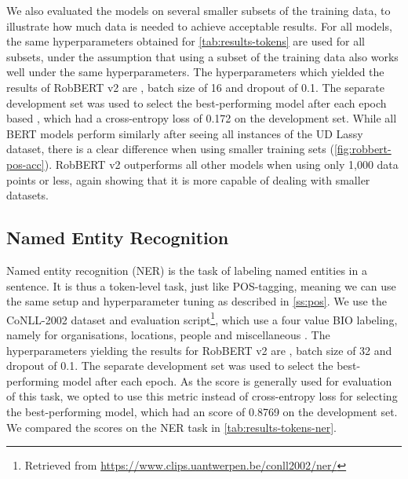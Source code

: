 \documentclass[11pt,a4paper]{article}
\begin{document}
We also evaluated the models on several smaller subsets of the training data, to illustrate how much data is needed to achieve acceptable results.
For all models, the same hyperparameters obtained for \autoref{tab:results-tokens} are used for all subsets, under the assumption that using a subset of the training data also works well under the same hyperparameters.
The hyperparameters which yielded the results of RobBERT v2 are , batch size of 16 and dropout of 0.1.
The separate development set was used to select the best-performing model after each epoch based , which had a cross-entropy loss of 0.172 on the development set.
While all BERT models perform similarly after seeing all instances of the UD Lassy dataset, there is a clear difference when using smaller training sets (\autoref{fig:robbert-pos-acc}).
RobBERT v2 outperforms all other models when using only 1,000 data points or less, again showing that it is more capable of dealing with smaller datasets.





\subsection{Named Entity Recognition}

Named entity recognition (NER) is the task of labeling named entities in a sentence.
It is thus a token-level task, just like POS-tagging, meaning we can use the same setup and hyperparameter tuning as described in \autoref{ss:pos}.
We use the CoNLL-2002 dataset and evaluation script\footnote{Retrieved from \url{https://www.clips.uantwerpen.be/conll2002/ner/}}, which use a four value BIO labeling, namely for organisations, locations, people and miscellaneous \citep{sang2002conll}.
The hyperparameters yielding the results for RobBERT v2 are , batch size of 32 and dropout of 0.1.
The separate development set was used to select the best-performing model after each epoch.
As the  score is generally used for evaluation of this task, we opted to use this metric instead of cross-entropy loss for selecting the best-performing model, which had an  score of 0.8769 on the development set.
We compared the  scores on the NER task in \autoref{tab:results-tokens-ner}.
\end{document}
